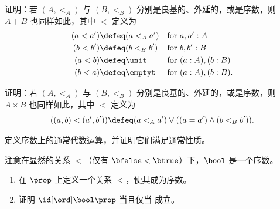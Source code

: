 \begin{ex}\label{ex:add-ordinals}
  证明：若 $(A,<_A)$ 与 $(B,<_B)$ 分别是良基的、外延的，或是序数，则 $A+B$ 也同样如此，其中 $<$ 定义为
  \begin{align*}
    (a<a') &\defeq (a<_A a') & \text{for }& a,a':A\\
    (b<b') &\defeq (b<_B b') & \text{for }& b,b':B\\
    (a<b) &\defeq \unit      & \text{for }& (a:A),(b:B)\\
    (b<a) &\defeq \emptyt    & \text{for }& (a:A),(b:B).
  \end{align*}
\end{ex}

\begin{ex}\label{ex:multiply-ordinals}
  证明：若 $(A,<_A)$ 与 $(B,<_B)$ 分别是良基的、外延的，或是序数，则 $A\times B$ 也同样如此，其中 $<$ 定义为
  \[ ((a,b) <(a',b')) \defeq (a<_A a') \vee ((a=a') \wedge (b<_B b')). \]
\end{ex}

\begin{ex}\label{ex:algebraic-ordinals}
  定义序数上的通常代数运算，并证明它们满足通常性质。
\end{ex}

\begin{ex}\label{ex:prop-ord}
  注意在显然的关系 $<$（仅有 $\bfalse<\btrue$）下，$\bool$ 是一个序数。
  \begin{enumerate}
  \item 在 $\prop$ 上定义一个关系 $<$，使其成为序数。
  \item 证明 $\id[\ord]\bool\prop$ 当且仅当 \LEM{} 成立。
  \end{enumerate}
\end{ex}

